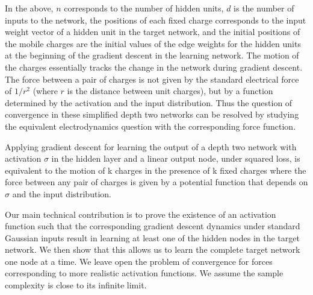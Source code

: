 In the above, $n$ corresponds to the number of hidden units, $d$ is the number of inputs to the  network, the positions of each fixed charge corresponds to the input weight vector of
a hidden unit in the target network, and the initial positions of the mobile charges are the initial values of the edge weights for the hidden units at the beginning of the gradient descent in the learning network. The motion of the charges essentially tracks the change in the network during gradient descent. The force between a pair of charges is not given by the standard electrical force of $1/r^2$ (where $r$ is the distance between unit charges), but by a function determined by the activation and the input distribution. Thus the question of convergence in these simplified depth two networks can be resolved by studying the equivalent electrodynamics question with the corresponding force function.
%
\begin{theorem}
Applying gradient descent for learning the output of a depth two network
with activation $\sigma$ in the hidden layer and a linear output
node, under squared loss, 
is equivalent to the motion of k charges in the presence of k fixed
charges where the force between any pair of charges is given by a
potential function that depends on $\sigma$ and the input distribution.
\end{theorem}
%

Our main technical contribution is to prove the existence of an activation function such that the corresponding gradient descent dynamics under standard Gaussian inputs result in learning at least one of the hidden nodes in the target network. We then show that this allows us to learn the complete target network one node at a time. We leave open the problem of convergence for forces corresponding to more realistic activation functions. We assume the sample complexity is close to its infinite limit. 
%

